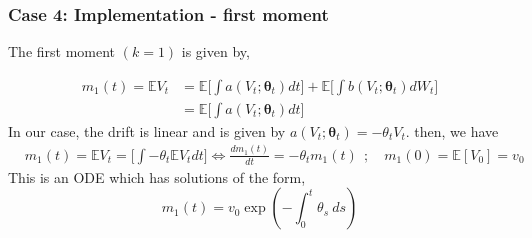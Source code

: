 \documentclass[aspectratio=169]{beamer}\usepackage[utf8]{inputenc}
\newcommand{\E}{\mathbb{E}}
\begin{document}
\begin{frame}\frametitle{ Case 4: Implementation - first moment }
The first moment $(k=1)$ is given by,

\begin{equation}
\begin{split}
 m_1(t) =\E V_t &=  \E \Big[  \int a(V_t; \bm{\theta}_t) dt \Big] + \E \Big[ \int b (V_t; \bm{\theta}_t ) dW_t  \Big] \\
 & = \E \Big[  \int a(V_t; \bm{\theta}_t) dt \Big]
\end{split}\label{main_V_1_moment}
\end{equation}
In our case, the drift is linear and is given by $ a(V_t; \bm{\theta}_t) = - \theta_t V_t$. then, we have 
\begin{equation}
\begin{split}
 & m_1(t) =\E V_t =     \Big[  \int - \theta_t \E V_t dt \Big] 
 \iff \frac{dm_1(t)}{dt}=    - \theta_t m_1(t) \ \ ; \quad m_1(0)=\E[V_0]= v_0
\end{split}\label{main_V_1_moment}
\end{equation}
This is an ODE which has solutions of the form, 
\begin{equation}
m_1(t) = v_0 \exp ( - \int_0^t \theta_s \ ds ) 
\end{equation}

\end{frame}
\end{document}
